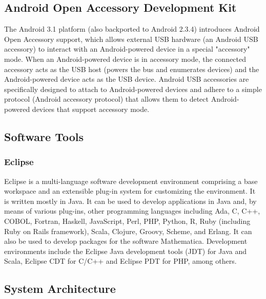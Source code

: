 \subsection{Android Open Accessory Development Kit}


The Android 3.1 platform (also backported to Android 2.3.4) introduces Android Open Accessory support, which allows external USB hardware (an Android USB accessory) to interact with an Android-powered device in a special "accessory" mode. When an Android-powered device is in accessory mode, the connected accessory acts as the USB host (powers the bus and enumerates devices) and the Android-powered device acts as the USB device. Android USB accessories are specifically designed to attach to Android-powered devices and adhere to a simple protocol (Android accessory protocol) that allows them to detect Android-powered devices that support accessory mode.




\subsection{Software Tools}


\subsubsection{Eclipse}
Eclipse is a multi-language software development environment comprising a base workspace and an extensible plug-in system for customizing the environment. It is written mostly in Java. It can be used to develop applications in Java and, by means of various plug-ins, other programming languages including Ada, C, C++, COBOL, Fortran, Haskell, JavaScript, Perl, PHP, Python, R, Ruby (including Ruby on Rails framework), Scala, Clojure, Groovy, Scheme, and Erlang. It can also be used to develop packages for the software Mathematica. Development environments include the Eclipse Java development tools (JDT) for Java and Scala, Eclipse CDT for C/C++ and Eclipse PDT for PHP, among others.


\subsection{System Architecture}

